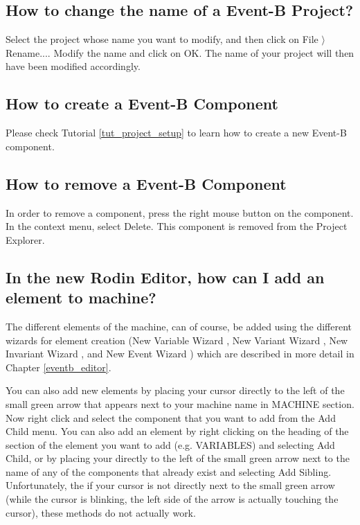 \subsection{How to change the name of a Event-B Project?}

Select the project whose name you want to modify, and then click on \textsf{File $\rangle$ Rename...}. Modify the name and click on \textsf{OK}. The name of your project will then have been modified accordingly. 

\subsection{How to create a Event-B Component}

Please check Tutorial \ref{tut_project_setup} to learn how to create a new Event-B component.

\subsection{How to remove a Event-B Component}

In order to remove a component, press the right mouse button on the component. In the context menu, select \textsf{Delete}. This component is removed from the \textsf{Project Explorer}. 

\subsection{In the new Rodin Editor, how can I add an element to machine?}
\label{faq_new_editor_new_element}

The different elements of the machine, can of course, be added using the different wizards for element creation (New Variable Wizard , New Variant Wizard , New Invariant Wizard , and New Event Wizard ) which are described in more detail in Chapter \ref{eventb_editor}. 

You can also add new elements by placing your cursor directly to the left of the small green arrow that appears next to your machine name in \textsf{MACHINE} section. Now right click and select the component that you want to add from the \textsf{Add Child} menu. You can also add an element by right clicking on the heading of the section of the element you want to add (e.g. \textsf{VARIABLES}) and selecting \textsf{Add Child}, or by placing your directly to the left of the small green arrow next to the name of any of the components that already exist and selecting \textsf{Add Sibling}. Unfortunately, the if your cursor is not directly next to the small green arrow (while the cursor is blinking, the left side of the arrow is actually touching the cursor), these methods do not actually work. 

